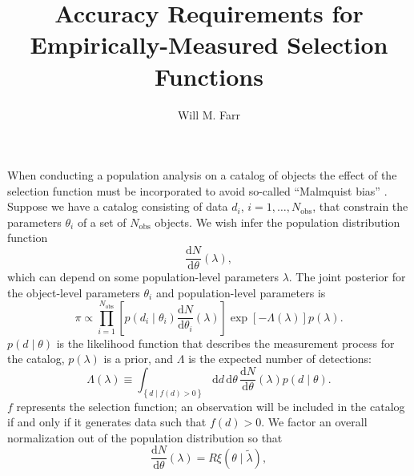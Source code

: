 \documentclass[modern]{aastex62}
\newcommand{\dd}{\mathrm{d}}
\newcommand{\diff}[2]{\frac{\dd #1}{\dd #2}}
\newcommand{\Nobs}{N_\mathrm{obs}}
\begin{document}
\title{Accuracy Requirements for Empirically-Measured Selection Functions}

\author[0000-0003-1540-8562]{Will M. Farr}

\maketitle

When conducting a population analysis on a catalog of objects the effect of the
selection function must be incorporated to avoid so-called ``Malmquist bias''
\citep{Malmquist1922,Loredo2004,Mandel2018}. Suppose we have a catalog
consisting of data $d_i$, $i = 1, \ldots, \Nobs$, that constrain the parameters
$\theta_i$ of a set of $\Nobs$ objects.  We wish infer the population
distribution function
%
\begin{equation}
  \diff{N}{\theta}\left( \lambda \right),
\end{equation}
%
which can depend on some population-level parameters $\lambda$.  The joint
posterior for the object-level parameters $\theta_i$ and population-level
parameters is \citep{Loredo2004,Mandel2018}
%
\begin{equation}
  \label{eq:posterior}
\pi \propto \prod_{i=1}^{\Nobs} \left[ p\left( d_i \mid \theta_i \right) \diff{N}{\theta_i}\left( \lambda \right) \right] \exp\left[ - \Lambda\left( \lambda \right) \right] p\left( \lambda \right).
\end{equation}
%
$p\left( d \mid \theta\right)$ is the likelihood function that describes the
measurement process for the catalog, $p\left( \lambda \right)$ is a prior, and
$\Lambda$ is the expected number of detections:
%
\begin{equation}
  \label{eq:selection-integral-unnorm}
  \Lambda\left( \lambda \right) \equiv \int_{\left\{ d \mid f(d) > 0 \right\}} \dd d \, \dd \theta \, \diff{N}{\theta}\left( \lambda \right) p\left( d \mid \theta \right).
\end{equation}
%
$f$ represents the selection function; an observation will be included in the
catalog if and only if it generates data such that $f(d) > 0$.  We factor an
overall normalization out of the population distribution so that
%
\begin{equation}
  \diff{N}{\theta}\left( \lambda \right) = R \xi\left( \theta \mid \tilde{\lambda} \right),
\end{equation}
\end{document}
